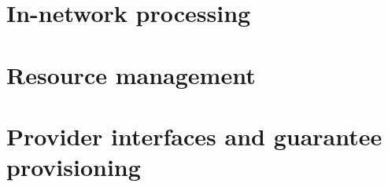 


\noindent



\section{In-network processing}

\section{Resource management}

\section{Provider interfaces and guarantee provisioning}





